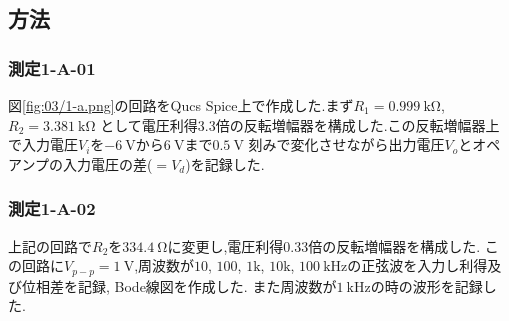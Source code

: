 \subsection{方法}
\subsubsection{測定1-A-01}
図\ref{fig:03/1-a.png}の回路をQucs Spice上で作成した.まず$R_1=0.999\ \si{\kilo\ohm}$, $R_2=3.381\ \si{\kilo\ohm}$
として電圧利得3.3倍の反転増幅器を構成した.この反転増幅器上で入力電圧$V_i$を$-6\ \si{\volt}$から$6\ \si{\volt}$まで$0.5\ \si{\volt}$
刻みで変化させながら出力電圧$V_o$とオペアンプの入力電圧の差($=V_d$)を記録した.
\subsubsection{測定1-A-02}
上記の回路で$R_2$を$334.4\ \si{\ohm}$に変更し,電圧利得0.33倍の反転増幅器を構成した.
この回路に$V_{p-p}=1\ \si{\volt}$,周波数が$10$, $100$, $1\si{\kilo}$, $10\si{\kilo}$, $100\ \si{\kilo\hertz}$の正弦波を入力し利得及び位相差を記録, Bode線図を作成した.
また周波数が$1\ \si{\kilo\hertz}$の時の波形を記録した.